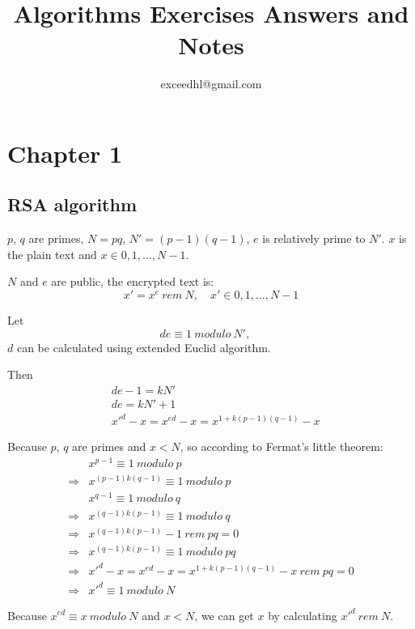 \documentclass[11pt]{article}
\title{Algorithms Exercises Answers and Notes}
\author{exceedhl@gmail.com}
\begin{document}
\maketitle

\section{Chapter 1}

\subsection{RSA algorithm}

$p$, $q$ are primes, $N=pq$, $N'=(p-1)(q-1)$, $e$ is relatively prime
to $N'$. $x$ is the plain text and $x \in {0, 1, \ldots, N-1}$.

$N$ and $e$ are public, the encrypted text is:
\begin{equation}
  x' = x^e\ rem\ N, \quad
  x' \in {0, 1, \ldots, N-1}
\end{equation}

Let 
\begin{equation}
  de \equiv 1 \ modulo\ N', \quad
\end{equation}
$d$ can be calculated using extended Euclid algorithm.

Then
\begin{align}
  & de - 1 = kN'\\
  & de = kN' + 1\\
  & x'^d-x = x^{ed} - x = x^{1+k(p-1)(q-1)}-x
\end{align}

Because $p$, $q$ are primes and $x < N$, so according to Fermat's
little theorem:
\begin{align}
  & x^{p-1} \equiv 1\ modulo\ p\\
  \Rightarrow & x^{(p-1)k(q-1)} \equiv 1\ modulo\ p\\  
  & x^{q-1} \equiv 1\ modulo\ q\\
  \Rightarrow & x^{(q-1)k(p-1)} \equiv 1\ modulo\ q\\
  \Rightarrow & x^{(q-1)k(p-1)}-1\ rem\ pq = 0\\
  \Rightarrow & x^{(q-1)k(p-1)} \equiv 1\ modulo\ pq\\
  \Rightarrow & x'^d-x = x^{ed} - x = x^{1+k(p-1)(q-1)}-x\ rem\ pq = 0\\
  \Rightarrow & x'^d \equiv 1\ modulo\ N
\end{align}

Because $x^{ed} \equiv x\ modulo\ N$ and $x < N$, we can get $x$ by
calculating $x'^d\ rem\ N$.
\end{document}
